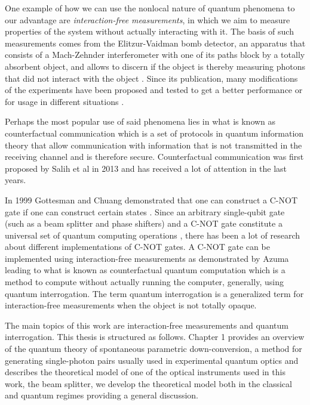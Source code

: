 \documentclass[12pt]{book}
\begin{document}
One example of how we can use the nonlocal nature of quantum phenomena to our advantage are \textit{interaction-free measurements}, in which we aim to measure properties of the system without actually interacting with it. The basis of such measurements comes from the Elitzur-Vaidman bomb detector, an apparatus that consists of a Mach-Zehnder interferometer with one of its paths block by a totally absorbent object, and allows to discern if the object is thereby measuring photons that did not interact with the object  \cite{Elitzur}. Since its publication, many modifications of the experiments have been proposed and tested to get a better performance or for usage in different situations \cite{Azuma,exp,QI1,Azuma2018,electronic}.

Perhaps the most popular use of said phenomena lies in what is known as counterfactual communication which is a set of protocols in quantum information theory that allow communication with information that is not transmitted in the receiving channel and is therefore secure. Counterfactual communication was first proposed by Salih et al in 2013 \cite{CComunication} and has received a lot of attention in the last years.

In 1999 Gottesman and Chuang demonstrated that one can construct a C-NOT gate if one can construct certain states \cite{Gottesman}. Since an arbitrary single-qubit gate (such as a beam splitter and phase shifters) and a C-NOT gate constitute a universal set of quantum computing operations \cite{chuang}, there has been a lot of research about different implementations of C-NOT gates. A C-NOT gate can be implemented using interaction-free measurements as demonstrated by Azuma \cite{AzumaComputation} leading to what is known as counterfactual quantum computation which is a method to compute without actually running the computer, generally, using quantum interrogation\cite{Hosten}. The term quantum interrogation is a generalized term for interaction-free measurements when the object is not totally opaque.


\thispagestyle{plain}


The main topics of this work are interaction-free measurements and quantum interrogation. This thesis is structured as follows. Chapter 1 provides an overview of the quantum theory of spontaneous parametric down-conversion, a method for generating single-photon pairs usually used in experimental quantum optics and describes the theoretical model of one of the optical instruments used in this work, the beam splitter, we develop the theoretical model both in the classical and quantum regimes providing a general discussion.
\end{document}
